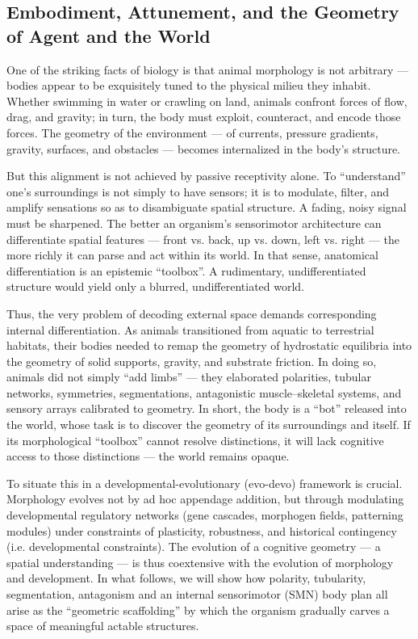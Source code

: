 \subsection{Embodiment, Attunement, and the Geometry of Agent and the World}
One of the striking facts of biology is that animal morphology is not arbitrary — bodies appear to be exquisitely tuned to the physical milieu they inhabit. Whether swimming in water or crawling on land, animals confront forces of flow, drag, and gravity; in turn, the body must exploit, counteract, and encode those forces. The geometry of the environment — of currents, pressure gradients, gravity, surfaces, and obstacles — becomes internalized in the body’s structure.

But this alignment is not achieved by passive receptivity alone. To “understand” one’s surroundings is not simply to have sensors; it is to modulate, filter, and amplify sensations so as to disambiguate spatial structure. A fading, noisy signal must be sharpened. The better an organism’s sensorimotor architecture can differentiate spatial features — front vs. back, up vs. down, left vs. right — the more richly it can parse and act within its world. In that sense, anatomical differentiation is an epistemic “toolbox”. A rudimentary, undifferentiated structure would yield only a blurred, undifferentiated world.

Thus, the very problem of decoding external space demands corresponding internal differentiation. As animals transitioned from aquatic to terrestrial habitats, their bodies needed to remap the geometry of hydrostatic equilibria into the geometry of solid supports, gravity, and substrate friction. In doing so, animals did not simply “add limbs” — they elaborated polarities, tubular networks, symmetries, segmentations,  antagonistic muscle–skeletal systems, and sensory arrays calibrated to geometry. In short, the body is a “bot” released into the world, whose task is to discover the geometry of its surroundings and itself. If its morphological “toolbox” cannot resolve distinctions, it will lack cognitive access to those distinctions — the world remains opaque.

To situate this in a developmental-evolutionary (evo-devo) framework is crucial. Morphology evolves not by ad hoc appendage addition, but through modulating developmental regulatory networks (gene cascades, morphogen fields, patterning modules) under constraints of plasticity, robustness, and historical contingency (i.e. developmental constraints). The evolution of a cognitive geometry — a spatial understanding — is thus coextensive with the evolution of morphology and development. In what follows, we will show how polarity, tubularity, segmentation, antagonism and an internal sensorimotor (SMN) body plan all arise as the “geometric scaffolding” by which the organism gradually carves a space of meaningful actable structures.


